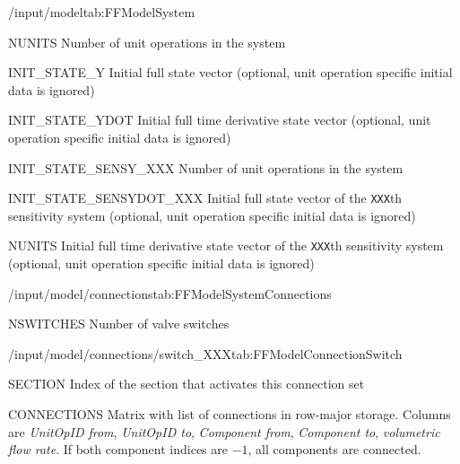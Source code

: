 \begin{groupscope}{/input/model}{tab:FFModelSystem}
  \begin{dataset}[type=int,range={$\geq 1$},length=1]{NUNITS}
    Number of unit operations in the system
  \end{dataset}
  \begin{dataset}[type=int,range={$\geq 1$},length=1]{INIT\_STATE\_Y}
    Initial full state vector (optional, unit operation specific initial data is ignored)
  \end{dataset}
  \begin{dataset}[type=double,length={\texttt{NDOF}}]{INIT\_STATE\_YDOT}
    Initial full time derivative state vector (optional, unit operation specific initial data is ignored)
  \end{dataset}
  \begin{dataset}[type=double,length={\texttt{NDOF}}]{INIT\_STATE\_SENSY\_XXX}
    Number of unit operations in the system
  \end{dataset}
  \begin{dataset}[type=double,length={\texttt{NDOF}}]{INIT\_STATE\_SENSYDOT\_XXX}
    Initial full state vector of the \texttt{XXX}th sensitivity system (optional, unit operation specific initial data is ignored)
  \end{dataset}
  \begin{dataset}[type=double,length={\texttt{NDOF}}]{NUNITS}
    Initial full time derivative state vector of the \texttt{XXX}th sensitivity system (optional, unit operation specific initial data is ignored)
  \end{dataset}
\end{groupscope}

\begin{groupscope}{/input/model/connections}{tab:FFModelSystemConnections}
  \begin{dataset}[type=int,range={$\geq 1$},length=1]{NSWITCHES}
    Number of valve switches
  \end{dataset}
\end{groupscope}

\begin{groupscope}{/input/model/connections/switch\_XXX}{tab:FFModelConnectionSwitch}
  \begin{dataset}[type=int,range={$\geq 0$},length=1]{SECTION}
    Index of the section that activates this connection set
  \end{dataset}
  \begin{dataset}[type=double,range={$\geq -1$},length={$5 \cdot \texttt{NCONNECTIONS}$}]{CONNECTIONS}
    Matrix with list of connections in row-major storage. Columns are \emph{UnitOpID from}, \emph{UnitOpID to}, \emph{Component from}, \emph{Component to}, \emph{volumetric flow rate}. If both component indices are $-1$, all components are connected.
  \end{dataset}
\end{groupscope}


